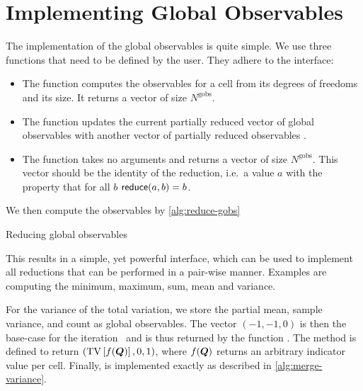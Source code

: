 \section{Implementing Global Observables}
\newcommand{\ngobs}{N^{\text{gobs}}}
The implementation of the global observables is quite simple.
We use three functions that need to be defined by the user.
They adhere to the interface:
\begin{itemize}
\item The function  computes the observables for a cell from its degrees of freedoms and its size.
  It returns a vector of size $\ngobs$.
\item The function  updates the current partially reduced vector of global observables  with another vector of partially reduced observables .
\item The function  takes no arguments and returns a vector of size $\ngobs$.
  This vector should be the identity of the reduction, i.e.\ a value $a$ with the property that for all $b$ $\textsf{reduce}(a, b) = b$.
\end{itemize}
We then compute the observables by \cref{alg:reduce-gobs}
\begin{algorithm}[htb]
  \begin{algorithmic}
    \EndFor{}
    \State{}
  \end{algorithmic}
  \caption{\label{alg:reduce-gobs}Reducing global observables}
\end{algorithm}
This results in a simple, yet powerful interface, which can be used to implement all reductions that can be performed in a pair-wise manner.
Examples are computing the minimum, maximum, sum, mean and variance.

For the variance of the total variation, we store the partial mean, sample variance, and count as global observables.
The vector $(-1, -1, 0)$ is then the base-case for the iteration~ and is thus returned by the function .
The method  is defined to return $\left( \operatorname{TV} \left[ f(\bm{Q}) \right], 0, 1 \right)$, where $f(\bm{Q})$ returns an arbitrary indicator value per cell.
Finally,  is implemented exactly as described in \cref{alg:merge-variance}.

